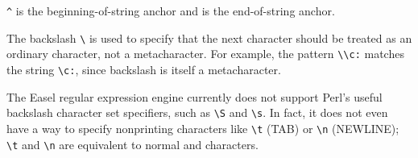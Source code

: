 \verb'^' is the beginning-of-string anchor and \ccode{\$} is the
end-of-string anchor. 

The backslash \verb+\+ is used to specify that the next character
should be treated as an ordinary character, not a metacharacter. For
example, the pattern \verb+\\c:+ matches the string \verb+\c:+, since
backslash is itself a metacharacter.

The Easel regular expression engine currently does not support Perl's
useful backslash character set specifiers, such as \verb+\S+ and
\verb+\s+. In fact, it does not even have a way to specify nonprinting
characters like \verb+\t+ (TAB) or \verb+\n+ (NEWLINE); \verb+\t+ and
\verb+\n+ are equivalent to normal  and  characters.



